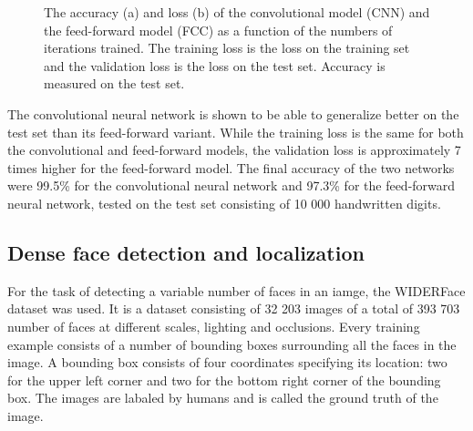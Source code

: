\documentclass[a4paper, twoside]{article}
\begin{document}
\begin{figure}[h]
    \centering
    \caption{The accuracy (a) and loss (b) of the convolutional model (CNN) and the feed-forward model (FCC) as a function of the numbers of iterations trained. The training loss is the loss on the training set and the validation loss is the loss on the test set. Accuracy is measured on the test set.} \label{figaccloss}
\end{figure}

The convolutional neural network is shown to be able to generalize better on the test set than its feed-forward variant. While the training loss is the same for both the convolutional and feed-forward models, the validation loss is approximately 7 times higher for the feed-forward model. The final accuracy of the two networks were 99.5\% for the convolutional neural network and 97.3\% for the feed-forward neural network, tested on the test set consisting of 10 000 handwritten digits. 

\subsection{Dense face detection and localization}
For the task of detecting a variable number of faces in an iamge, the WIDERFace dataset was used. It is a dataset consisting of 32 203 images of a total of 393 703 number of faces at different scales, lighting and occlusions. Every training example consists of a number of bounding boxes surrounding all the faces in the image. A bounding box consists of four coordinates specifying its location: two for the upper left corner and two for the bottom right corner of the bounding box. The images are labaled by humans and is called the ground truth of the image. \cite{WIDERFace}
\end{document}
